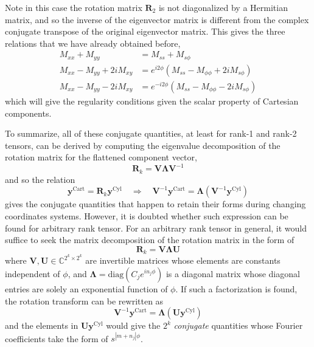 Note in this case the rotation matrix $\mathbf{R}_2$ is not diagonalized by a Hermitian matrix, and so the inverse of the eigenvector matrix is different from the complex conjugate transpose of the original eigenvector matrix.
This gives the three relations that we have already obtained before,
\[\begin{aligned}
    M_{xx} + M_{yy} &= M_{ss} + M_{s\phi} \\ 
    M_{xx} - M_{yy} + 2i M_{xy} &= e^{i2\phi} \left(M_{ss} - M_{\phi\phi} + 2i M_{s\phi}\right) \\ 
    M_{xx} - M_{yy} - 2i M_{xy} &= e^{-i2\phi} \left(M_{ss} - M_{\phi\phi} - 2i M_{s\phi}\right)
\end{aligned}\]
which will give the regularity conditions given the scalar property of Cartesian components.

To summarize, all of these conjugate quantities, at least for rank-1 and rank-2 tensors, can be derived by computing the eigenvalue decomposition of the rotation matrix for the flattened component vector,
\[\mathbf{R}_k = \mathbf{V} \bm{\Lambda} \mathbf{V}^{-1}\]
and so the relation
\[\mathbf{y}^{\mathrm{Cart}} = \mathbf{R}_k \mathbf{y}^{\mathrm{Cyl}} \quad \Longrightarrow \quad \mathbf{V}^{-1} \mathbf{y}^{\mathrm{Cart}} = \bm{\Lambda} \left(\mathbf{V}^{-1} \mathbf{y}^{\mathrm{Cyl}}\right)
\]
gives the conjugate quantities that happen to retain their forms during changing coordinates systems.
However, it is doubted whether such expression can be found for arbitrary rank tensor.
For an arbitrary rank tensor in general, it would suffice to seek the matrix decomposition of the rotation matrix in the form of
\begin{equation}
    \mathbf{R}_k = \mathbf{V} \bm{\Lambda} \mathbf{U}
\end{equation}
where $\mathbf{V}, \mathbf{U} \in \mathbb{C}^{2^k\times 2^k}$ are invertible matrices whose elements are constants independent of $\phi$, and $\bm{\Lambda} = \mathrm{diag}\left(C_j e^{i n_j \phi}\right)$ is a diagonal matrix whose diagonal entries are solely an exponential function of $\phi$.
If such a factorization is found, the rotation transform can be rewritten as
\begin{equation}
    \mathbf{V}^{-1} \mathbf{y}^\mathrm{Cart} = \bm{\Lambda} \left(\mathbf{U} \mathbf{y}^\mathrm{Cyl}\right)
\end{equation}
and the elements in $\mathbf{U} \mathbf{y}^\mathrm{Cyl}$ would give the $2^k$ \textit{conjugate} quantities whose Fourier coefficients take the form of $s^{|m+n_j|\phi}$.


